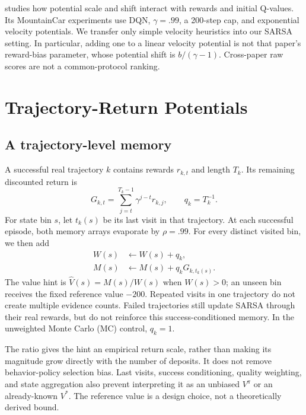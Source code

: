 \documentclass[10pt,twocolumn,letterpaper]{article}
\begin{document}
\citet{muller2025} studies how potential scale and shift interact with rewards and initial Q-values. Its MountainCar experiments use DQN, $\gamma=.99$, a 200-step cap, and exponential velocity potentials. We transfer only simple velocity heuristics into our SARSA setting. In particular, adding one to a linear velocity potential is not that paper's reward-bias parameter, whose potential shift is $b/(\gamma-1)$. Cross-paper raw scores are not a common-protocol ranking.

\section{Trajectory-Return Potentials}
\subsection{A trajectory-level memory}
A successful real trajectory $k$ contains rewards $r_{k,t}$ and length $T_k$. Its remaining discounted return is
\begin{equation}
 G_{k,t}=\sum_{j=t}^{T_k-1}\gamma^{j-t}r_{k,j},
 \qquad q_k=T_k^{-1}.
\end{equation}
For state bin $s$, let $t_k(s)$ be its last visit in that trajectory. At each successful episode, both memory arrays evaporate by $\rho=.99$. For every distinct visited bin, we then add
\begin{align}
 W(s)&\leftarrow W(s)+q_k,\nonumber\\
 M(s)&\leftarrow M(s)+q_k G_{k,t_k(s)}.
 \label{eq:memory}
\end{align}
The value hint is $\widehat V(s)=M(s)/W(s)$ when $W(s)>0$; an unseen bin receives the fixed reference value $-200$. Repeated visits in one trajectory do not create multiple evidence counts. Failed trajectories still update SARSA through their real rewards, but do not reinforce this success-conditioned memory. In the unweighted Monte Carlo (MC) control, $q_k=1$.

The ratio gives the hint an empirical return scale, rather than making its magnitude grow directly with the number of deposits. It does not remove behavior-policy selection bias. Last visits, success conditioning, quality weighting, and state aggregation also prevent interpreting it as an unbiased $V^\pi$ or an already-known $V^*$. The reference value is a design choice, not a theoretically derived bound.
\end{document}

